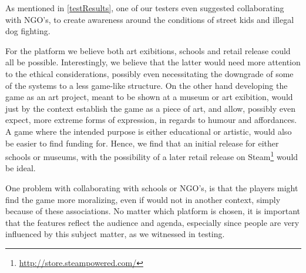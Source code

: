 As mentioned in \ref{testResults}, one of our testers even suggested collaborating with NGO's, to create awareness around the conditions of street kids and illegal dog fighting. \

For the platform we believe both art exibitions, schools and retail release could all be possible. Interestingly, we believe that the latter would need more attention to the ethical considerations, possibly even necessitating the downgrade of some of the systems to a less game-like structure. On the other hand developing the game as an art project, meant to be shown at a museum or art exibition, would just by the context establish the game as a piece of art, and allow, possibly even expect, more extreme forms of expression, in regards to humour and affordances.
A game where the intended purpose is either educational or artistic, would also be easier to find funding for. 
Hence, we find that an initial release for either schools or museums, with the possibility of a later retail release on Steam\footnote{\url{http://store.steampowered.com/}} would be ideal.\

One problem with collaborating with schools or NGO's, is that the players might find the game more moralizing, even if would not in another context, simply because of these associations. No matter which platform is chosen, it is important that the features reflect the audience and agenda, especially since people are very influenced by this subject matter, as we witnessed in testing.\